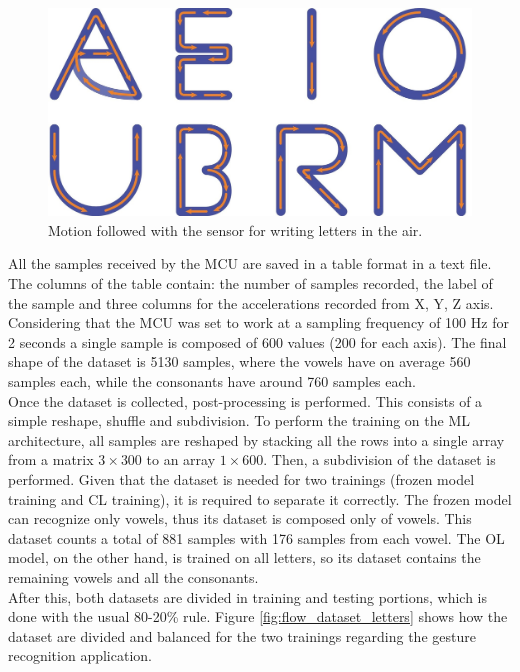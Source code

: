 \documentclass[12pt]{report}
\begin{document}
\begin{figure}[h!]
    \centering
    \includegraphics[width=120mm]{Figures/Chapter4/letters_motion.jpg} 
    \caption{Motion followed with the sensor for writing letters in the air.}
    \label{fig:letters_motion}    
\end{figure}

All the samples received by the MCU are saved in a table format in a text file. The columns of the table contain: the number of samples recorded, the label of the sample and three columns for the accelerations recorded from X, Y, Z axis. Considering that the MCU was set to work at a sampling frequency of 100 Hz for 2 seconds a single sample is composed of 600 values (200 for each axis). 
The final shape of the dataset is 5130 samples, where the vowels have on average 560 samples each, while the consonants have around 760 samples each. \\
Once the dataset is collected, post-processing is performed. This consists of a simple reshape, shuffle and subdivision. To perform the training on the ML architecture, all samples are reshaped by stacking all the rows into a single array from a matrix $3 \times 300$ to an array $1 \times 600$. Then, a subdivision of the dataset is performed. Given that the dataset is needed for two trainings (frozen model training and CL training), it is required to separate it correctly. The frozen model can recognize only vowels, thus its dataset is composed only of vowels. This dataset counts a total of 881 samples with 176 samples from each vowel. The OL model, on the other hand, is trained on all letters, so its dataset contains the remaining vowels and all the consonants. \\
After this, both datasets are divided in training and testing portions, which is done with the usual 80-20\% rule. Figure \ref{fig:flow_dataset_letters} shows how the dataset are divided and balanced for the two trainings regarding the gesture recognition application.
\end{document}
